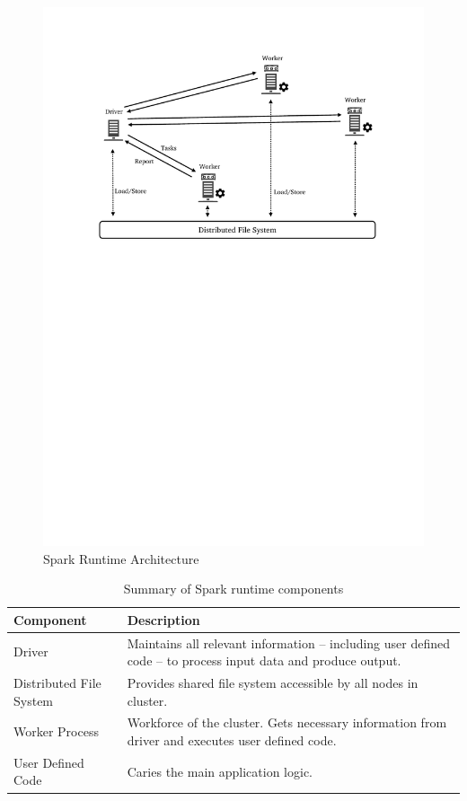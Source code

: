 \begin{figure}[h]
    \centering
    \includegraphics[clip,trim=3cm 16.8cm 2.5cm 2.5cm]{spark-high.pdf}
    \caption[Spark Runtime Architecture]{Spark Runtime Architecture\footnotemark}
    \label{fig:spark-runtime}
\end{figure}
\begin{table}[ht]
    \begin{tabularx}{\textwidth}{lX}
        \toprule
        \textbf{Component} & \textbf{Description}\\
        \midrule
        Driver & Maintains all relevant information -- including user defined code -- to process input data and produce output.\\
        Distributed File System & Provides shared file system accessible by all nodes in cluster.\\
        Worker Process & Workforce of the cluster. Gets necessary information from driver and executes user defined code.\\
        User Defined Code & Caries the main application logic.\\
        \bottomrule
    \end{tabularx}
    \centering
    \caption{Summary of Spark runtime components}
    \label{tab:spark-runtime}
\end{table}

